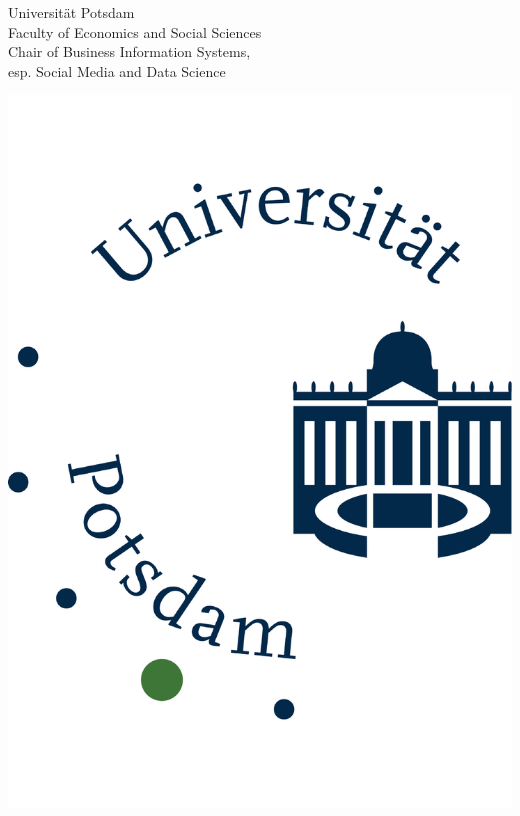 \begin{titlepage}
\begin{center}
				
				\begin{minipage}[t]{11cm}
							\vspace*{0.1cm}
							Universität Potsdam \\
							Faculty of Economics and Social Sciences\\
							Chair of Business Information Systems,\\
							esp. Social Media and Data Science
				\end{minipage}
				\begin{minipage}[t]{3cm} \vspace{-\ht\strutbox}
							\begin{center} 
							\includegraphics[width=\textwidth]{assets/images/logo} \end{center}
				\end{minipage} 
				  

\end{center}
\end{titlepage}

